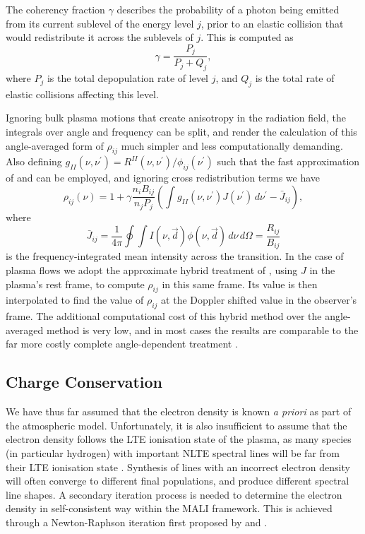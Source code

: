 The coherency fraction $\gamma$ describes the probability of a photon being emitted from its current sublevel of the energy level $j$, prior to an elastic collision that would redistribute it across the sublevels of $j$.
This is computed as
\begin{equation}
    \gamma = \frac{P_j}{P_j + Q_j},
\end{equation}
where $P_j$ is the total depopulation rate of level $j$, and $Q_j$ is the total rate of elastic collisions affecting this level.

Ignoring bulk plasma motions that create anisotropy in the radiation field, the integrals over angle and frequency can be split, and render the calculation of this angle-averaged form of $\rho_{ij}$ much simpler and less computationally demanding.
Also defining $g_{II}(\nu, \nu^\prime) = R^{II}(\nu, \nu^\prime)/\phi_{ij}(\nu^\prime)$ such that the fast approximation of \citet{Gouttebroze1986} and \citet{Uitenbroek1989} can be employed, and ignoring cross redistribution terms we have
\begin{equation}
    \label{Eq:RhoPrdAa}
    \rho_{ij}(\nu) = 1 + \gamma \frac{n_i B_{ij}}{n_j P_j} \left( \int g_{II}(\nu, \nu^\prime) J(\nu^\prime)\,d\nu^\prime - \bar{J}_{ij} \right),
\end{equation}
where
\begin{equation}
\bar{J}_{ij} = \frac{1}{4\pi} \oint \int I(\nu, \vec{d}) \phi(\nu, \vec{d})\,d\nu\,d\Omega = \frac{R_{ij}}{B_{ij}}
\end{equation}
is the frequency-integrated mean intensity across the transition.
In the case of plasma flows we adopt the approximate hybrid treatment of \citet{Leenaarts2012}, using $J$ in the plasma's rest frame, to compute $\rho_{ij}$ in this same frame.
Its value is then interpolated to find the value of $\rho_{ij}$ at the Doppler shifted value in the observer's frame.
The additional computational cost of this hybrid method over the angle-averaged method is very low, and in most cases the results are comparable to the far more costly complete angle-dependent treatment \citep{Leenaarts2012a, Kerr2019}.

\subsection{Charge Conservation}

We have thus far assumed that the electron density is known \emph{a priori} as part of the atmospheric model.
Unfortunately, it is also insufficient to assume that the electron density follows the LTE ionisation state of the plasma, as many species (in particular hydrogen) with important NLTE spectral lines will be far from their LTE ionisation state \citep{Heinzel1995,Paletou1995,Bjorgen2019}.
Synthesis of lines with an incorrect electron density will often converge to different final populations, and produce different spectral line shapes.
A secondary iteration process is needed to determine the electron density in self-consistent way within the MALI framework.
This is achieved through a Newton-Raphson iteration first proposed by \citet{Heinzel1995} and \citet{Paletou1995}.


